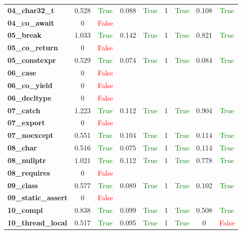\documentclass{article}
\begin{document}
\begin{xltabular}{\textwidth}{lcccccccc}
\textbf{04\_char32\_t}& 0.528&\textcolor{green}{True}& 0.088&\textcolor{green}{True}& 1&\textcolor{green}{True}& 0.108&\textcolor{green}{True} \\[0.5ex]
\textbf{04\_co\_await}& 0&\textcolor{red}{False} \\[0.5ex]
\textbf{05\_break}& 1.033&\textcolor{green}{True}& 0.142&\textcolor{green}{True}& 1&\textcolor{green}{True}& 0.821&\textcolor{green}{True} \\[0.5ex]
\textbf{05\_co\_return}& 0&\textcolor{red}{False} \\[0.5ex]
\textbf{05\_constexpr}& 0.529&\textcolor{green}{True}& 0.074&\textcolor{green}{True}& 1&\textcolor{green}{True}& 0.084&\textcolor{green}{True} \\[0.5ex]
\textbf{06\_case}& 0&\textcolor{red}{False} \\[0.5ex]
\textbf{06\_co\_yield}& 0&\textcolor{red}{False} \\[0.5ex]
\textbf{06\_decltype}& 0&\textcolor{red}{False} \\[0.5ex]
\textbf{07\_catch}& 1.223&\textcolor{green}{True}& 0.112&\textcolor{green}{True}& 1&\textcolor{green}{True}& 0.904&\textcolor{green}{True} \\[0.5ex]
\textbf{07\_export}& 0&\textcolor{red}{False} \\[0.5ex]
\textbf{07\_noexcept}& 0.551&\textcolor{green}{True}& 0.104&\textcolor{green}{True}& 1&\textcolor{green}{True}& 0.114&\textcolor{green}{True} \\[0.5ex]
\textbf{08\_char}& 0.516&\textcolor{green}{True}& 0.075&\textcolor{green}{True}& 1&\textcolor{green}{True}& 0.114&\textcolor{green}{True} \\[0.5ex]
\textbf{08\_nullptr}& 1.021&\textcolor{green}{True}& 0.112&\textcolor{green}{True}& 1&\textcolor{green}{True}& 0.778&\textcolor{green}{True} \\[0.5ex]
\textbf{08\_requires}& 0&\textcolor{red}{False} \\[0.5ex]
\textbf{09\_class}& 0.577&\textcolor{green}{True}& 0.089&\textcolor{green}{True}& 1&\textcolor{green}{True}& 0.102&\textcolor{green}{True} \\[0.5ex]
\textbf{09\_static\_assert}& 0&\textcolor{red}{False} \\[0.5ex]
\textbf{10\_compl}& 0.838&\textcolor{green}{True}& 0.099&\textcolor{green}{True}& 1&\textcolor{green}{True}& 0.508&\textcolor{green}{True} \\[0.5ex]
\textbf{10\_thread\_local}& 0.517&\textcolor{green}{True}& 0.095&\textcolor{green}{True}& 1&\textcolor{green}{True}& 0&\textcolor{red}{False} \\[0.5ex]

\end{xltabular}
\end{document}
